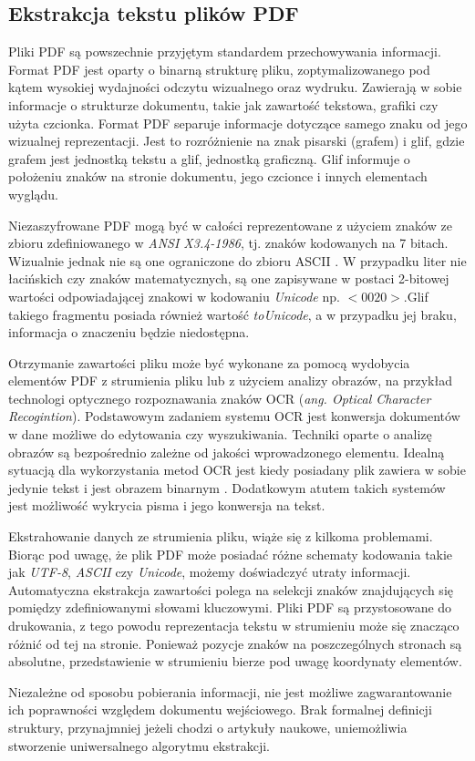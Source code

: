 \documentclass[12pt,a4paper,twoside]{article}
\begin{document}
\subsection{Ekstrakcja tekstu plików PDF}
Pliki PDF są powszechnie przyjętym standardem przechowywania informacji. Format PDF jest oparty o binarną strukturę pliku, zoptymalizowanego pod kątem wysokiej wydajności odczytu wizualnego oraz wydruku. Zawierają w sobie informacje o strukturze dokumentu, takie jak zawartość tekstowa, grafiki czy użyta czcionka. Format PDF separuje informacje dotyczące samego znaku od jego wizualnej reprezentacji. Jest to rozróżnienie na znak pisarski (grafem) i glif, gdzie grafem jest jednostką tekstu a glif, jednostką graficzną. Glif informuje o położeniu znaków na stronie dokumentu, jego czcionce i innych elementach wyglądu.\par Niezaszyfrowane PDF mogą być w całości reprezentowane z użyciem znaków ze zbioru zdefiniowanego w \textit{ANSI X3.4-1986}, tj. znaków kodowanych na 7 bitach. Wizualnie jednak nie są one ograniczone do zbioru ASCII \cite{ISO32000}. W przypadku liter nie łacińskich czy znaków matematycznych, są one zapisywane w postaci 2-bitowej wartości odpowiadającej znakowi w kodowaniu \textit{Unicode} np. $<0020>$.\break Glif takiego fragmentu posiada również wartość \textit{toUnicode}, a w przypadku jej braku, informacja o znaczeniu będzie niedostępna. \par
Otrzymanie zawartości pliku może być wykonane za pomocą wydobycia elementów PDF z strumienia pliku lub z użyciem analizy obrazów, na przykład technologi optycznego rozpoznawania znaków OCR (\textit{ang. Optical Character Recogintion}). 
Podstawowym zadaniem systemu OCR jest konwersja dokumentów w dane możliwe do edytowania czy wyszukiwania. Techniki oparte o analizę obrazów są bezpośrednio zależne od jakości wprowadzonego elementu. Idealną sytuacją dla wykorzystania metod OCR jest kiedy posiadany plik zawiera w sobie jedynie tekst i jest obrazem binarnym \cite{mithe2013optical}. Dodatkowym atutem takich systemów jest możliwość wykrycia pisma i jego konwersja na tekst.\par
Ekstrahowanie danych ze strumienia pliku, wiąże się z kilkoma problemami. Biorąc pod uwagę, że plik PDF może posiadać różne schematy kodowania takie jak \textit{UTF-8}, \textit{ASCII} czy \textit{Unicode}, możemy doświadczyć utraty informacji. Automatyczna ekstrakcja zawartości polega na selekcji znaków znajdujących się pomiędzy zdefiniowanymi słowami kluczowymi. Pliki PDF są przystosowane do drukowania, z tego powodu reprezentacja tekstu w strumieniu może się znacząco różnić od tej na stronie. Ponieważ pozycje znaków na poszczególnych stronach są absolutne, przedstawienie w strumieniu bierze pod uwagę koordynaty elementów.\par
Niezależne od sposobu pobierania informacji, nie jest możliwe zagwarantowanie ich poprawności względem dokumentu wejściowego. Brak formalnej definicji struktury, przynajmniej jeżeli chodzi o artykuły naukowe, uniemożliwia stworzenie uniwersalnego algorytmu ekstrakcji.
\end{document}
